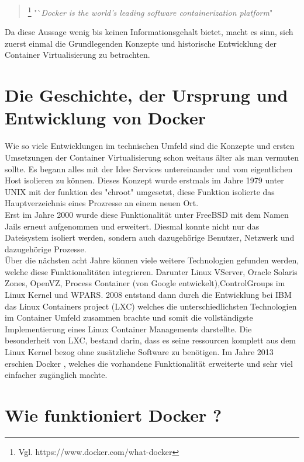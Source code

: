 \documentclass[12pt,toc=bib,toc=listof]{scrreprt}
\begin{document}
\begin{quote}
	\footnote[1]{Vgl. https://www.docker.com/what-docker}
	"`\textit{Docker is the world's leading software containerization platform}"
\end{quote}
Da diese Aussage wenig bis keinen Informationsgehalt bietet, macht es sinn, sich zuerst einmal die Grundlegenden Konzepte und historische Entwicklung der Container Virtualisierung zu betrachten. 

\section{Die Geschichte, der Ursprung und Entwicklung von Docker}
Wie so viele Entwicklungen im technischen Umfeld sind die Konzepte und ersten Umsetzungen der Container Virtualisierung schon weitaus älter als man vermuten sollte.
Es begann alles mit der Idee Services untereinander und vom eigentlichen Host isolieren zu können.
Dieses Konzept wurde erstmals im Jahre 1979 unter UNIX mit der funktion des "chroot" umgesetzt, diese Funktion isolierte das Hauptverzeichnis eines Prozresse an einem neuen Ort.\\
Erst im Jahre 2000 wurde diese Funktionalität unter FreeBSD mit dem Namen Jails erneut aufgenommen und erweitert.
Diesmal konnte nicht nur das Dateisystem isoliert werden, sondern auch dazugehörige Benutzer, Netzwerk und dazugehörige Prozesse.\\
Über die nächsten acht Jahre können viele weitere Technologien gefunden werden, welche diese Funktionalitäten integrieren. Darunter 
Linux VServer, Oracle Solaris Zones, OpenVZ, Process Container (von Google entwickelt),ControlGroups im Linux Kernel und WPARS.
2008 entstand dann durch die Entwicklung bei IBM  das Linux Containers project (LXC) welches die unterschiedlichsten Technologien im Container Umfeld zusammen brachte und somit die vollständigste Implementierung eines Linux Container Managements darstellte.
Die besonderheit von LXC, bestand darin, dass es seine ressourcen komplett aus dem Linux Kernel bezog ohne zusätzliche Software zu benötigen.
Im Jahre 2013 erschien Docker , welches die vorhandene Funktionalität erweiterte und sehr viel einfacher zugänglich machte.

\section{Wie funktioniert Docker ?}
\end{document}
